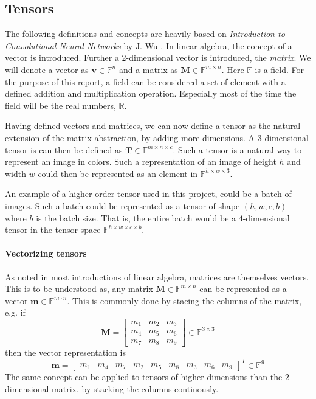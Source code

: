 \documentclass[11pt,a4paper]{article}
\newcommand{\bm}[1]{\textbf{#1}}
\newcommand{\vecsym}[1]{\bm{#1}}
\newcommand{\matsym}[1]{\bm{#1}}
\newcommand{\tenssym}[1]{\bm{#1}}
\begin{document}
\subsection{Tensors}
The following definitions and concepts are heavily based on \textit{Introduction to Convolutional Neural Networks} by J. Wu \cite{tensorIntroduction}.
In linear algebra, the concept of a vector is introduced.
Further a 2-dimensional vector is introduced, the \textit{matrix}.
We will denote a vector as $\vecsym{v}\in \mathbb{F}^n$ and a matrix as $\matsym{M}\in \mathbb{F}^{m\times n}$.
Here $\mathbb{F}$ is a field.
For the purpose of this report, a field can be considered a set of element with a defined addition and multiplication operation.
Especially most of the time the field will be the real numbers, $\mathbb{R}$.

Having defined vectors and matrices, we can now define a tensor as the natural extension of the matrix abstraction,
by adding more dimensions.
A $3$-dimensional tensor is can then be defined as $\tenssym{T}\in \mathbb{F}^{m\times n\times c}$.
Such a tensor is a natural way to represent an image in colors.
Such a representation of an image of height $h$ and width $w$ could then be represented as an
element in $\mathbb{F}^{h\times w\times 3}$.

An example of a higher order tensor used in this project, could be a batch of images.
Such a batch could be represented as a tensor of shape $(h, w, c, b)$ where $b$ is the batch size. 
That is, the entire batch would be a $4$-dimensional tensor in the tensor-space $\mathbb{F}^{h\times w\times c\times b}$.

\paragraph{Vectorizing tensors}
As noted in most introductions of linear algebra, matrices are themselves vectors.
This is to be understood as, any matrix $\matsym{M} \in \mathbb{F}^{m\times n}$ can be represented as a vector $\vecsym{m} \in \mathbb{F}^{m\cdot n}$.
This is commonly done by stacing the columns of the matrix, e.g.  if 
\begin{equation}
\matsym{M} = \begin{bmatrix}
    m_1 & m_2 & m_3 \\
    m_4 & m_5 & m_6 \\
    m_7 & m_8 & m_9
\end{bmatrix} \in \mathbb{F}^{3 \times 3}
\end{equation}
then the vector representation is
\begin{equation}
\vecsym{m} = \begin{bmatrix}
    m_1 & m_4 & m_7 & m_2 & m_5 & m_8 & m_3 & m_6 & m_9
\end{bmatrix}^T \in \mathbb{F}^{9}
\end{equation}
The same concept can be applied to tensors of higher dimensions than the $2$-dimensional matrix,
by stacking the columns continously.
\end{document}
